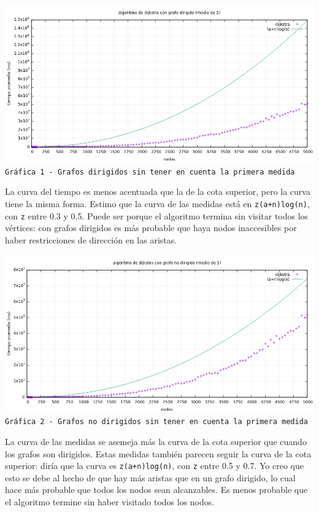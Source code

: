 \documentclass[12pt , a4paper]{article}
\begin{document}
	\hspace*{-.15\linewidth}
	\includegraphics[width=1.25\hsize]{dir5.png}
	\texttt{Gráfica 1 - Grafos dirigidos sin tener en cuenta la primera medida}
	\newline
	
	La curva del tiempo es menos acentuada que la de la cota superior, pero la curva tiene la misma forma. Estimo que la curva de las medidas está en \texttt{z(a+n)log(n)}, con \texttt{z} entre 0.3 y 0.5. Puede ser porque el algoritmo termina sin visitar todos los vértices: con grafos dirigidos es más probable que haya nodos inaccesibles por haber restricciones de dirección en las aristas. 
	
	
	\newpage
	\hspace*{-.15\linewidth}
	\includegraphics[width=1.25\hsize]{nodir5.png}
	\texttt{Gráfica 2 - Grafos no dirigidos sin tener en cuenta la primera medida}
	\newline	
	
	La curva de las medidas se asemeja más la curva de la cota superior que cuando los grafos son dirigidos. Estas medidas también parecen seguir la curva de la cota superior: diría que la curva es \texttt{z(a+n)log(n)}, con \texttt{z} entre 0.5 y 0.7.  Yo creo que esto se debe al hecho de que hay más aristas que en un grafo dirigido, lo cual hace más probable que todos los nodos sean alcanzables. Es menos probable que el algoritmo termine sin haber visitado todos los nodos.
\end{document}
